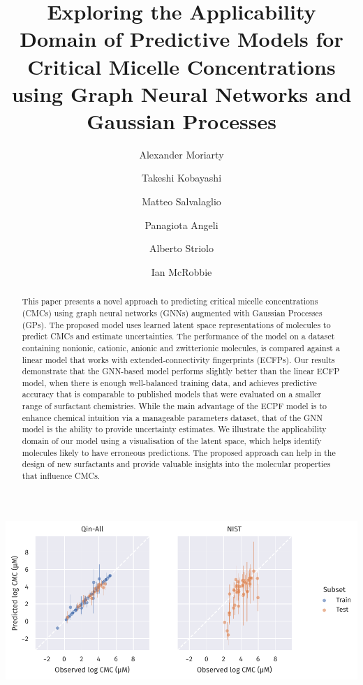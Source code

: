 \documentclass[journal=jcisd8,manuscript=article]{achemso}
\author{Alexander Moriarty}
\author{Takeshi Kobayashi}
\author{Matteo Salvalaglio}
\author{Panagiota Angeli}
\author{Alberto Striolo}
\affiliation[UCL]{Department of Chemical Engineering, University College London, UK}
\author{Ian McRobbie}
\affiliation[Innospec]{Senior Vice President, Research and Technology, Innospec Ltd., Ellesmere Port, UK}
\title{Exploring the Applicability Domain of Predictive Models for Critical Micelle Concentrations using Graph Neural Networks and Gaussian Processes}
\begin{document}
\begin{tocentry}
    \includegraphics[width=\textwidth]{images/uq-parity.pdf}
\end{tocentry}

\begin{abstract}
    This paper presents a novel approach to predicting critical micelle
    concentrations (CMCs) using graph neural networks (GNNs) augmented with
    Gaussian Processes (GPs). The proposed model uses learned latent space
    representations of molecules to predict CMCs and estimate uncertainties. The
    performance of the model on a dataset containing nonionic, cationic, anionic
    and zwitterionic molecules, is compared against a linear model that works
    with extended-connectivity fingerprints (ECFPs). Our results demonstrate
    that the GNN-based model performs slightly better than the linear ECFP
    model, when there is enough well-balanced training data, and achieves
    predictive accuracy that is comparable to published models that were
    evaluated on a smaller range of surfactant chemistries. While the main
    advantage of the ECPF model is to enhance chemical intuition via a
    manageable parameters dataset, that of the GNN model is the ability to
    provide uncertainty estimates. We illustrate the applicability domain of our
    model using a visualisation of the latent space, which helps identify
    molecules likely to have erroneous predictions. The proposed approach can
    help in the design of new surfactants and provide valuable insights into the
    molecular properties that influence CMCs.
\end{abstract}
\end{document}
